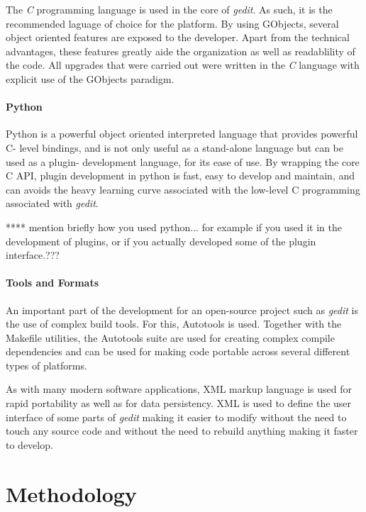 The \emph{C} programming language is used in the core of \emph{gedit}.   As such, it is 
the recommended laguage of choice for the platform.  By using GObjects, several 
object oriented features are exposed to the developer.  Apart from the technical advantages, 
these features greatly aide the organization as well as readablility of the code.
All upgrades that were carried out were written in the \emph{C} language with explicit
use of the GObjects paradigm. 

\paragraph{Python}

Python is a powerful object oriented interpreted language that provides powerful 
C- level bindings, and is not only useful as a stand-alone language but can be used 
as a plugin- development language, for its ease of use.   By wrapping the core 
C API, plugin development in python is fast, easy to develop and maintain, and 
can avoids the heavy learning curve associated with the low-level C programming 
associated with \emph{gedit}.


**** mention briefly how you used python... for example if you used it 
  in the development of plugins, or if you actually developed some 
  of the plugin interface.???




\paragraph{Tools and Formats}


An important part of the development for an open-source project such as \emph{gedit} is 
the use of complex build tools.   For this, Autotools is used. 
Together with the Makefile utilities, the Autotools suite are used for creating complex
compile dependencies and can be used for making code portable across several different 
types of platforms.

As with many modern software applications, XML markup language is used for 
rapid portability as well as for data persistency. XML is used to 
define the user interface of some parts of \emph{gedit} making it easier to
modify without the need to touch any source code and without the need to 
rebuild anything making it faster to develop.


\section{Methodology}\label{sec:Methodology}

